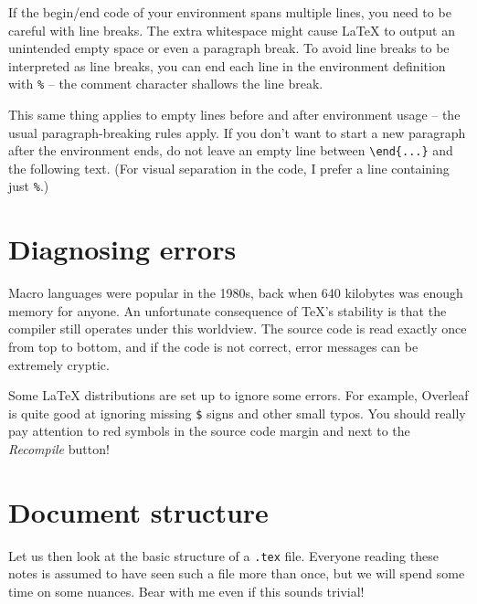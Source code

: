 \begin{gotcha}
If the begin/end code of your environment spans multiple lines,
you need to be careful with line breaks.
The extra whitespace might cause \LaTeX{} to output an unintended empty space
or even a paragraph break.
To avoid line breaks to be interpreted as line breaks,
you can end each line in the environment definition with \verb|%|
-- the comment character shallows the line break.

This same thing applies to empty lines before and after environment usage
-- the usual paragraph-breaking rules apply.
If you don't want to start a new paragraph after the environment ends,
do not leave an empty line between \verb|\end{...}| and the following text.
(For visual separation in the code, I prefer a line containing just \verb|%|.)
\end{gotcha}





%
%
%
\section{Diagnosing errors}

Macro languages were popular in the 1980s, back when 640 kilobytes was enough memory for anyone.
An unfortunate consequence of \TeX's stability is that the compiler still operates under this worldview.
The source code is read exactly once from top to bottom,
and if the code is not correct, error messages can be extremely cryptic.

\begin{overleaf}
Some \LaTeX{} distributions are set up to ignore some errors.
For example, Overleaf is quite good at ignoring missing \verb|$| signs and other small typos.
You should really pay attention to red symbols in the source code margin
and next to the \emph{Recompile} button!
\end{overleaf}




%
%
%
\section{Document structure}\label{sec:document structure}

Let us then look at the basic structure of a \verb|.tex| file.
Everyone reading these notes is assumed to have seen such a file more than once,
but we will spend some time on some nuances.
Bear with me even if this sounds trivial!

